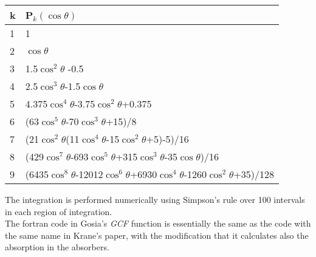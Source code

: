 \begin{center}
\begin{tabular}{|ll|}
\hline
k & P$_k(\cos\theta)$\\
\hline
1 & 1\\
2 & $\cos\theta$\\
3 & 1.5$\cos^2\theta$ -0.5\\
4 & 2.5$\cos^3\theta$-1.5$\cos\theta$\\
5 & 4.375$\cos^4\theta$-3.75$\cos^2\theta$+0.375\\
6 & (63$\cos^5\theta$-70$\cos^3\theta$+15)/8\\
7 & (21$\cos^2\theta$(11$\cos^4\theta$-15$\cos^2\theta$+5)-5)/16\\
8 & (429$\cos^7\theta$-693$\cos^5\theta$+315$\cos^3\theta$-35$\cos\theta$)/16\\
9 & (6435$\cos^8\theta$-12012$\cos^6\theta$+6930$\cos^4\theta$-1260$\cos^2\theta$+35)/128\\
\hline
\end{tabular}
\end{center}

\noindent The integration is performed numerically using Simpson's rule over
100 intervals in each region of integration.\\

\noindent The fortran code in Gosia's {\em GCF} function is essentially the
same as the code with the same name in Krane's paper, with the modification
that it calculates also the absorption in the absorbers.\\
